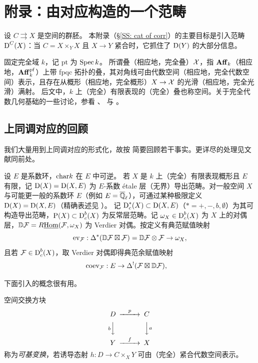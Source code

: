 \section{附录：由对应构造的一个范畴}
设 $C\rightrightarrows X$ 是空间的群胚。
本附录（\S \ref{SS: cat of corr}）的主要目标是引入范畴 $\operatorname{D}^C(X)$：当 $C=X\times_YX$ 且 $X\to Y$ 紧合时，它抓住了 $\operatorname{D}(Y)$ 的大部分信息。

固定完全域 $k$，记 $\mathrm{pt}$ 为 $\operatorname{Spec} k$。
所谓叠（相应地，完全叠）${\mathcal X}$，指 ${\mathbf{Aff}}_k$（相应地，${\mathbf{Aff}}_k^{\operatorname{pf}}$）上带 fpqc 拓扑的叠，其对角线可由代数空间（相应地，完全代数空间）表示，且存在从概形（相应地，完全概形）$X\to {\mathcal X}$ 的光滑（相应地，完全光滑）满射。
后文中，$k$ 上（完全）有限表现的（完全）叠也称空间。关于完全代数几何基础的一些讨论，参看 \cite[附录 A]{Zh1}、\cite{BS} 与 \cite[\S A.1]{XZ}。

\subsection{上同调对应的回顾}
\label{Sec:cohomological correspondence}
我们大量用到上同调对应的形式化，故按 \cite[\S A.2]{XZ} 简要回顾若干事实。更详尽的处理见文献同前处。

设 $E$ 是系数环，${\operatorname{char}} k$ 在 $E$ 中可逆。
若 $X$ 是 $k$ 上（完全）有限表现概形且 $E$ 有限，记 $\operatorname{D}(X)=\operatorname{D}(X,E)$ 为 $E$-系数 étale 层（无界）导出范畴。对一般空间 $X$ 与可能更一般的系数环 $E$（例如 $E={\overline{{\mathbb Q}}_\ell}$），可通过某种极限定义 $\operatorname{D}(X)=\operatorname{D}(X,E)$（精确表述见 \cite[\S A.1.15]{XZ}）。
记 $\operatorname{D}^*_c(X)\subset \operatorname{D}(X,E)$（$*=+,-,b,\emptyset$）为其可构造导出范畴，$\operatorname{P}(X)\subset\operatorname{D}_c^b(X)$ 为反常层范畴。记 $\omega_X\in \operatorname{D}_c^b(X)$ 为 $X$ 上的对偶层，${\mathbb D}{\mathcal F}=R\underline{{\operatorname{Hom}}}({\mathcal F},\omega_X)$ 为 Verdier 对偶。按定义有典范赋值映射
\begin{equation}
\label{E: VD counit}
 \operatorname{ev}_{\mathcal F}: \Delta^*({\mathbb D}{\mathcal F}\boxtimes{\mathcal F})={\mathbb D}{\mathcal F}\otimes {\mathcal F}\to \omega_X,
\end{equation}
且若 ${\mathcal F}\in\operatorname{D}_c^b(X)$，取 Verdier 对偶即得典范余赋值映射
\begin{equation}
\label{E: VD unit}
\operatorname{coev}_{\mathcal F}: E\to \Delta^!({\mathcal F}\boxtimes{\mathbb D}{\mathcal F}),\quad
\end{equation}

下面引入的概念很有用。
\begin{dfn}
\label{D: basechangeable}
空间交换方块
\begin{equation}
\label{E: basechangeable}
\begin{CD}
D@>p>>C\\
@VbVV@VVaV\\
Y@>f>>X
\end{CD}
\end{equation}
称为\emph{可基变换}，若诱导态射 $h:D\to C\times_XY$ 可由（完全）紧合代数空间表示。
\end{dfn}

